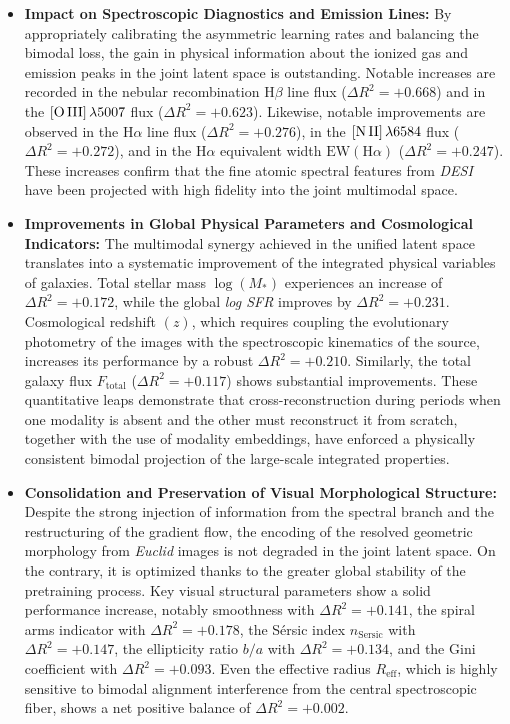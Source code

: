 \begin{itemize}
	
	\item \textbf{Impact on Spectroscopic Diagnostics and Emission Lines:}
	By appropriately calibrating the asymmetric learning rates and balancing the bimodal loss, the gain in physical information about the ionized gas and emission peaks in the joint latent space is outstanding. Notable increases are recorded in the nebular recombination $\text{H}\beta$ line flux ($\Delta R^2 = +0.668$) and in the $[\text{O\,III}]\,\lambda 5007$ flux ($\Delta R^2 = +0.623$). Likewise, notable improvements are observed in the $\text{H}\alpha$ line flux ($\Delta R^2 = +0.276$), in the $[\text{N\,II}]\,\lambda 6584$ flux ($\Delta R^2 = +0.272$), and in the $\text{H}\alpha$ equivalent width $\text{EW}(\text{H}\alpha)$ ($\Delta R^2 = +0.247$). These increases confirm that the fine atomic spectral features from \textit{\gls{DESI}} have been projected with high fidelity into the joint multimodal space.
	
	\item \textbf{Improvements in Global Physical Parameters and Cosmological Indicators:}
	The multimodal synergy achieved in the unified latent space translates into a systematic improvement of the integrated physical variables of galaxies. Total stellar mass $\log(M_*)$ experiences an increase of $\Delta R^2 = +0.172$, while the global \textit{log \gls{SFR}} improves by $\Delta R^2 = +0.231$. Cosmological redshift $(z)$, which requires coupling the evolutionary photometry of the images with the spectroscopic kinematics of the source, increases its performance by a robust $\Delta R^2 = +0.210$. Similarly, the total galaxy flux $F_{\text{total}}$ ($\Delta R^2 = +0.117$) shows substantial improvements. These quantitative leaps demonstrate that cross-reconstruction during periods when one modality is absent and the other must reconstruct it from scratch, together with the use of modality embeddings, have enforced a physically consistent bimodal projection of the large-scale integrated properties.
	
	\item \textbf{Consolidation and Preservation of Visual Morphological Structure:}
	Despite the strong injection of information from the spectral branch and the restructuring of the gradient flow, the encoding of the resolved geometric morphology from \textit{Euclid} images is not degraded in the joint latent space. On the contrary, it is optimized thanks to the greater global stability of the pretraining process. Key visual structural parameters show a solid performance increase, notably smoothness with $\Delta R^2 = +0.141$, the spiral arms indicator with $\Delta R^2 = +0.178$, the Sérsic index $n_{\text{Sersic}}$ with $\Delta R^2 = +0.147$, the ellipticity ratio $b/a$ with $\Delta R^2 = +0.134$, and the Gini coefficient with $\Delta R^2 = +0.093$. Even the effective radius $R_{\text{eff}}$, which is highly sensitive to bimodal alignment interference from the central spectroscopic fiber, shows a net positive balance of $\Delta R^2 = +0.002$.
\end{itemize}

